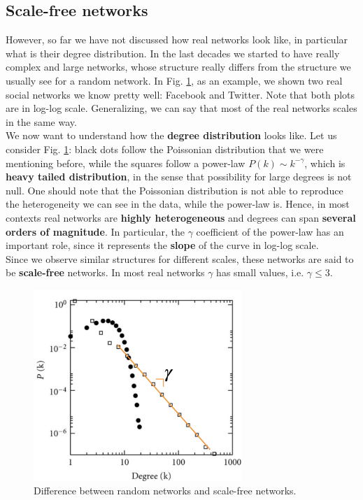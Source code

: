 \documentclass[../main/main.tex]{subfiles}
\begin{document}
\subsection{Scale-free networks}

However, so far we have not discussed how real networks look like, in particular what is their degree distribution. In the last decades we started to have really complex and large networks, whose structure really differs from the structure we usually see for a random network. In Fig. \ref{fig:06_4}, as an example, we shown two real social networks we know pretty well: Facebook and Twitter. Note that both plots are in log-log scale. Generalizing, we can say that most of the real networks scales in the same way.\\ 
We now want to understand how the \textbf{degree distribution} looks like. Let us consider Fig. \ref{fig:06_4}: black dots follow the Poissonian distribution that we were mentioning before, while the squares follow a power-law \( P(k) \sim k^{- \gamma  } \), which is \textbf{heavy tailed distribution}, in the sense that possibility for large degrees is not null. One should note that the Poissonian distribution is not able to reproduce the heterogeneity we can see in the data, while the power-law is. Hence, in most contexts real networks are \textbf{highly heterogeneous} and degrees can span \textbf{several orders of magnitude}. In particular, the \( \gamma   \) coefficient of the power-law has an important role, since it represents the \textbf{slope} of the curve in log-log scale.\\
Since we observe similar structures for different scales, these networks are said to be \textbf{scale-free} networks. In most real networks $\gamma$ has small values, i.e. \( \gamma \le 3 \).


\begin{figure}[h!]
\centering
\includegraphics[width=0.7\textwidth]{../lessons/image/06/5.png}
\caption{\label{fig:06_4} Difference between random networks and scale-free networks.}
\end{figure}
\end{document}
